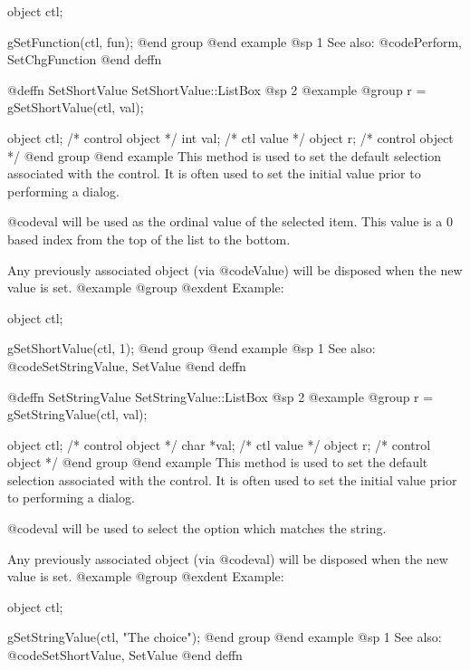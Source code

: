 object  ctl;

gSetFunction(ctl, fun);
@end group
@end example
@sp 1
See also:  @code{Perform, SetChgFunction}
@end deffn


















@deffn {SetShortValue} SetShortValue::ListBox
@sp 2
@example
@group
r = gSetShortValue(ctl, val);

object  ctl;    /*  control object  */
int     val;    /*  ctl value       */
object  r;      /*  control object  */
@end group
@end example
This method is used to set the default selection associated with the
control.  It is often used to set the initial value prior to performing
a dialog.

@code{val} will be used as the ordinal value of the selected item.  This
value is a 0 based index from the top of the list to the bottom.

Any previously associated object (via @code{Value}) will be disposed
when the new value is set.
@example
@group
@exdent Example:

object  ctl;

gSetShortValue(ctl, 1);
@end group
@end example
@sp 1
See also:  @code{SetStringValue, SetValue}
@end deffn









@deffn {SetStringValue} SetStringValue::ListBox
@sp 2
@example
@group
r = gSetStringValue(ctl, val);

object  ctl;    /*  control object  */
char    *val;   /*  ctl value       */
object  r;      /*  control object  */
@end group
@end example
This method is used to set the default selection associated with the
control.  It is often used to set the initial value prior to performing
a dialog.  

@code{val} will be used to select the option which matches the string.

Any previously associated object (via @code{val}) will be disposed when
the new value is set.  
@example
@group
@exdent Example:

object  ctl;

gSetStringValue(ctl, "The choice");
@end group
@end example
@sp 1
See also:  @code{SetShortValue, SetValue}
@end deffn











